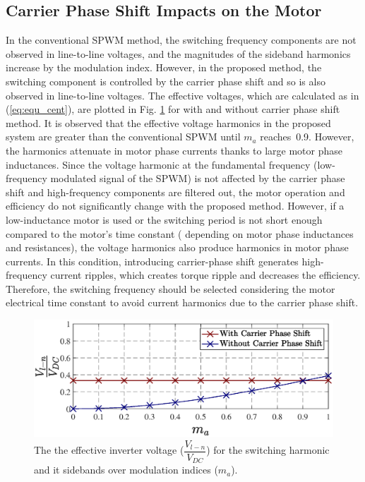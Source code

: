 \documentclass[journal]{IEEEtran}
\begin{document}
\subsection{Carrier Phase Shift Impacts on the Motor}
In the conventional SPWM method, the switching frequency components are not observed in line-to-line voltages, and the magnitudes of the sideband harmonics increase by the modulation index. 
However, in the proposed method, the switching component is controlled by the carrier phase shift and so is also observed in line-to-line voltages.
The effective voltages, which are calculated as in (\ref{eq:equ_cent}), are plotted in Fig. \ref{fig:W/outCar} for with and without carrier phase shift method. 
It is observed that the effective voltage harmonics in the proposed system are greater than the conventional SPWM until $m_a$ reaches~0.9. 
However, the harmonics attenuate in motor phase currents thanks to large motor phase inductances. Since the voltage harmonic at the fundamental frequency (low-frequency modulated signal of the SPWM) is not affected by the carrier phase shift and high-frequency components are filtered out, the motor operation and efficiency do not significantly change with the proposed method. 
However, if a low-inductance motor is used or the switching period is not short enough compared to the motor's time constant ( depending on motor phase inductances and resistances), the voltage harmonics also produce harmonics in motor phase currents. 
In this condition,  introducing carrier-phase shift generates high-frequency current ripples, which creates torque ripple and decreases the efficiency.  
Therefore, the switching frequency should be selected considering the motor electrical time constant to avoid current harmonics due to the carrier phase shift.
\vspace*{-3mm}
\begin{figure}[h!]
    \centering
    \includegraphics[width=1\linewidth]{CPS_impact.eps}
    \caption{The the effective inverter voltage ($\dfrac{V_{l-n}}{V_{DC}}$) for the switching harmonic and it sidebands over modulation indices ($m_a$).}
    \label{fig:W/outCar}
\end{figure}
\end{document}
